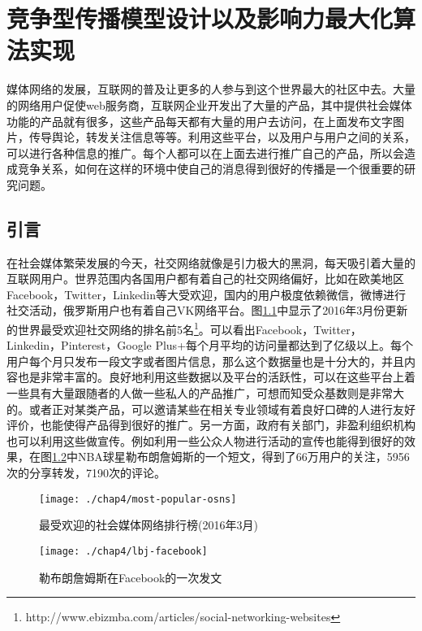 

\chapter{竞争型传播模型设计以及影响力最大化算法实现}
\label{cha:4thChap04}
媒体网络的发展，互联网的普及让更多的人参与到这个世界最大的社区中去。大量的网络用户促使web服务商，互联网企业开发出了大量的产品，其中提供社会媒体功能的产品就有很多，这些产品每天都有大量的用户去访问，在上面发布文字图片，传导舆论，转发关注信息等等。利用这些平台，以及用户与用户之间的关系，可以进行各种信息的推广。每个人都可以在上面去进行推广自己的产品，所以会造成竞争关系，如何在这样的环境中使自己的消息得到很好的传播是一个很重要的研究问题。

\section{引言}

在社会媒体繁荣发展的今天，社交网络就像是引力极大的黑洞，每天吸引着大量的互联网用户。世界范围内各国用户都有着自己的社交网络偏好，比如在欧美地区Facebook，Twitter，Linkedin等大受欢迎，国内的用户极度依赖微信，微博进行社交活动，俄罗斯用户也有着自己VK网络平台。图\ref{fig:chap4-most-pop-osns}中显示了2016年3月份更新的世界最受欢迎社交网络的排名前5名\footnote{http://www.ebizmba.com/articles/social-networking-websites}。可以看出Facebook，Twitter，Linkedin，Pinterest，Google Plus+每个月平均的访问量都达到了亿级以上。每个用户每个月只发布一段文字或者图片信息，那么这个数据量也是十分大的，并且内容也是非常丰富的。良好地利用这些数据以及平台的活跃性，可以在这些平台上着一些具有大量跟随者的人做一些私人的产品推广，可想而知受众基数则是非常大的。或者正对某类产品，可以邀请某些在相关专业领域有着良好口碑的人进行友好评价，也能使得产品得到很好的推广。另一方面，政府有关部门，非盈利组织机构也可以利用这些做宣传。例如利用一些公众人物进行活动的宣传也能得到很好的效果，在图\ref{fig:chap4-lbj-facebook}中NBA球星勒布朗詹姆斯的一个短文，得到了66万用户的关注，5956次的分享转发，7190次的评论。

\begin{figure}[H]
	\centering
	\texttt{[image: ./chap4/most-popular-osns]}
	\caption{最受欢迎的社会媒体网络排行榜(2016年3月)}
	\label{fig:chap4-most-pop-osns}
\end{figure}


\begin{figure}[H]
	\centering
	\texttt{[image: ./chap4/lbj-facebook]}
	\caption{勒布朗詹姆斯在Facebook的一次发文}
	\label{fig:chap4-lbj-facebook}
\end{figure}

